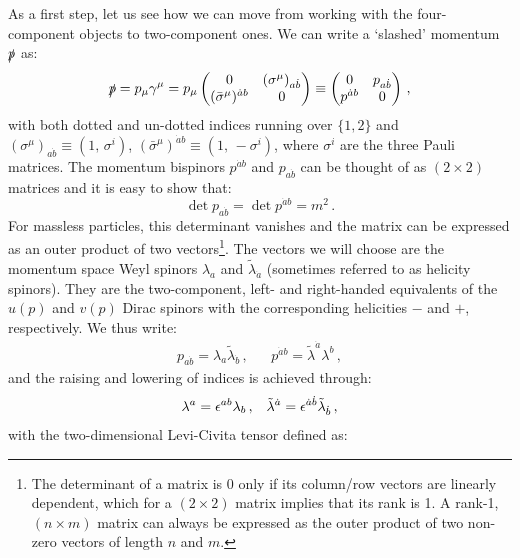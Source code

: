 \documentclass[main.tex]{subfiles}
\begin{document}
As a first step, let us see how we can move from working with the four-component objects to two-component ones. We can write a `slashed' momentum $\slashed{p}$ as:
\begin{equation} \label{eq:pslashed1}
    \slashed{p} = p_\mu \gamma^\mu = p_\mu
    \begin{pmatrix}
    0 & (\sigma^\mu)_{a\dot{b}} \\
    (\bar{\sigma}^\mu)^{\dot{a}b} & 0
    \end{pmatrix}
    \equiv
    \begin{pmatrix}
    0 & p_{a\dot{b}} \\
    p^{\dot{a}b} & 0 
    \end{pmatrix} \,,
\end{equation}
with both dotted and un-dotted indices running over $\{1,2\}$ and $(\sigma^\mu)_{a\dot{b}} \equiv (1, \, \sigma^i)$, $(\bar{\sigma}^\mu)^{\dot{a}b} \equiv (1, \, -\sigma^i)$, where $\sigma^i$ are the three Pauli matrices. The momentum bispinors $p^{\dot{a}b}$ and $p_{a\dot{b}}$ can be thought of as $(2 \times 2)$ matrices and it is easy to show that:
\begin{equation}
    \det p_{a\dot{b}} = \det p^{\dot{a}b} = m^2\,.
\end{equation}
For massless particles, this determinant vanishes and the matrix can be expressed as an outer product of two vectors\footnote{The determinant of a matrix is 0 only if its column/row vectors are linearly dependent, which for a $(2 \times 2)$ matrix implies that its rank is 1. A rank-1, $(n \times m)$ matrix can always be expressed as the outer product of two non-zero vectors of length $n$ and $m$.}. The vectors we will choose are the momentum space Weyl spinors $\lambda_a$  and $\tilde{\lambda}_{\dot{a}}$ (sometimes referred to as helicity spinors). They are the two-component, left- and right-handed equivalents of the $u(p)$ and $v(p)$ Dirac spinors with the corresponding helicities $-$ and $+$, respectively. We thus write:
\begin{align} \label{eq:outerproduct}
    p_{a\dot{b}} = \lambda_a \tilde{\lambda}_{\dot{b}}\,, && p^{\dot{a}b} = \tilde{\lambda}^{\dot{a}} \lambda^b\,,
\end{align}
and the raising and lowering of indices is achieved through:
\begin{align}
    \lambda^a = \epsilon^{ab} \lambda_b\,, && \tilde{\lambda}^{\dot{a}} = \epsilon^{\dot{a}\dot{b}} \tilde{\lambda}_{\dot{b}} \,,
\end{align}
with the two-dimensional Levi-Civita tensor defined as:
\end{document}

